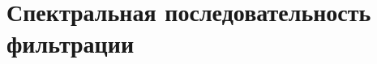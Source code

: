 \documentclass[
	extrafontsizes,
	11pt,
	hyphens,
]{memoir}
\begin{document}
%
%
%


\section{Спектральная последовательность фильтрации}
\end{document}

